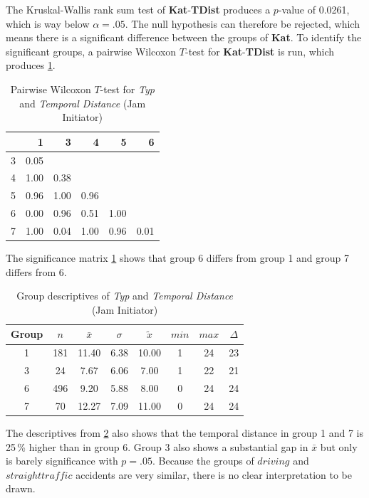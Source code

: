 The Kruskal-Wallis rank sum test of \textbf{Kat}-\textbf{TDist} produces a $p$-value of 0.0261, which is way below $\alpha=.05$. The null hypothesis can therefore be rejected, which means there is a significant difference between the groups of \textbf{Kat}. To identify the significant groups, a pairwise Wilcoxon $T$-test for \textbf{Kat}-\textbf{TDist} is run, which produces \cref{tbl:wilcoxon_baysis_initiator_Typ_TDist}. 
\begin{table}[ht]
	\tiny
	\centering
    \begin{tabular}{rrrrrr}
        \toprule
        & 1 & 3 & 4 & 5 & 6 \\ 
        \midrule
        3 & 0.05 &  &  &  &  \\ 
        4 & 1.00 & 0.38 &  &  &  \\ 
        5 & 0.96 & 1.00 & 0.96 &  &  \\ 
        6 & 0.00 & 0.96 & 0.51 & 1.00 &  \\ 
        7 & 1.00 & 0.04 & 1.00 & 0.96 & 0.01 \\ 
        \bottomrule
    \end{tabular}
    \caption{Pairwise Wilcoxon $T$-test for \textit{Typ} and \textit{Temporal Distance} (Jam Initiator)}
    \label{tbl:wilcoxon_baysis_initiator_Typ_TDist}
\end{table}
The significance matrix \cref{tbl:wilcoxon_baysis_initiator_Typ_TDist} shows that group 6 differs from group 1 and group 7 differs from 6. 
\begin{table}[ht]
	\tiny
	\centering
    \begin{tabular}{c|c|c|c|c|c|c|c}
        \toprule
        Group & $n$ & $\bar{x}$ & $\sigma$ & $\tilde{x}$ & $min$ & $max$ & $\Delta$ \\
        \midrule
        1 & 181 & 11.40 & 6.38 & 10.00 & 1  & 24 & 23 \\ 
        3 & 24  & 7.67  & 6.06 & 7.00  & 1  & 22 & 21 \\ 
        6 & 496 & 9.20  & 5.88 & 8.00  & 0  & 24 & 24 \\ 
        7 & 70  & 12.27 & 7.09 & 11.00 & 0  & 24 & 24 \\ 
        \bottomrule
    \end{tabular}
    \caption{Group descriptives of \textit{Typ} and \textit{Temporal Distance} (Jam Initiator)}
    \label{tbl:descriptives_baysis_initiator_Typ_TDist}
\end{table}
The descriptives from \cref{tbl:descriptives_baysis_initiator_Typ_TDist} also shows that the temporal distance in group 1 and 7 is 25\,\% higher than in group 6. Group 3 also shows a substantial gap in $\bar{x}$ but only is barely significance with $p=.05$. Because the groups of $driving$ and $straight traffic$ accidents are very similar, there is no clear interpretation to be drawn.

